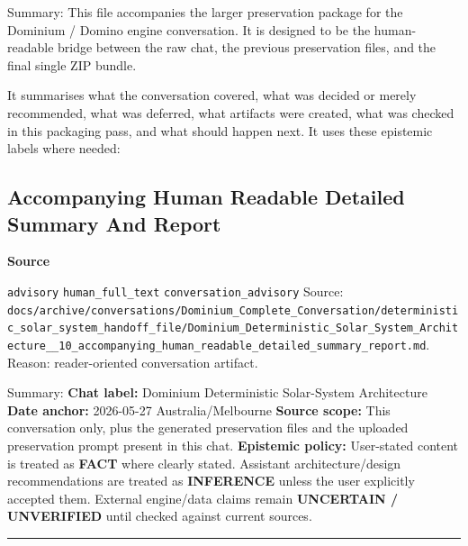 \documentclass[9pt,a4paper,openany]{book}
\newcommand{\vonecallout}[3]{\par\medskip\noindent\begingroup\setlength{\fboxsep}{7pt}\colorbox{DomCalloutBg}{\parbox{0.94\linewidth}{\textbf{\textcolor{#1}{#2}}\par #3}}\endgroup\par\medskip}
\begin{document}
Summary: This file accompanies the larger preservation package for the Dominium /\allowbreak{} Domino engine conversation.\allowbreak{} It is designed to be the human-\allowbreak{}readable bridge between the raw chat, the previous preservation files, and the final single ZIP bundle.\allowbreak{}


It summarises what the conversation covered, what was decided or merely recommended, what was deferred, what artifacts were created, what was checked in this packaging pass, and what should happen next.\allowbreak{} It uses these epistemic labels where needed:



\subsection{Accompanying Human Readable Detailed Summary And Report}

\vonecallout{DomSlate}{Source}{\texttt{advisory} \texttt{human\_\allowbreak{}full\_\allowbreak{}text} \texttt{conversation\_\allowbreak{}advisory} Source: \texttt{docs/\allowbreak{}archive/\allowbreak{}conversations/\allowbreak{}Dominium\_\allowbreak{}Complete\_\allowbreak{}Conversation/\allowbreak{}deterministic\_\allowbreak{}solar\_\allowbreak{}system\_\allowbreak{}handoff\_\allowbreak{}file/\allowbreak{}Dominium\_\allowbreak{}Deterministic\_\allowbreak{}Solar\_\allowbreak{}System\_\allowbreak{}Architecture\_\allowbreak{}\_\allowbreak{}10\_\allowbreak{}accompanying\_\allowbreak{}human\_\allowbreak{}readable\_\allowbreak{}detailed\_\allowbreak{}summary\_\allowbreak{}report.\allowbreak{}md}.\allowbreak{} Reason: reader-\allowbreak{}oriented conversation artifact.\allowbreak{}}

Summary: \textbf{Chat label:} Dominium Deterministic Solar-\allowbreak{}System Architecture \textbf{Date anchor:} 2026-\allowbreak{}05-\allowbreak{}27 Australia/\allowbreak{}Melbourne \textbf{Source scope:} This conversation only, plus the generated preservation files and the uploaded preservation prompt present in this chat.\allowbreak{} \textbf{Epistemic policy:} User-\allowbreak{}stated content is treated as \textbf{FACT} where clearly stated.\allowbreak{} Assistant architecture/\allowbreak{}design recommendations are treated as \textbf{INFERENCE} unless the user explicitly accepted them.\allowbreak{} External engine/\allowbreak{}data claims remain \textbf{UNCERTAIN / UNVERIFIED} until checked against current sources.\allowbreak{}


\par\medskip\hrule\medskip
\end{document}
